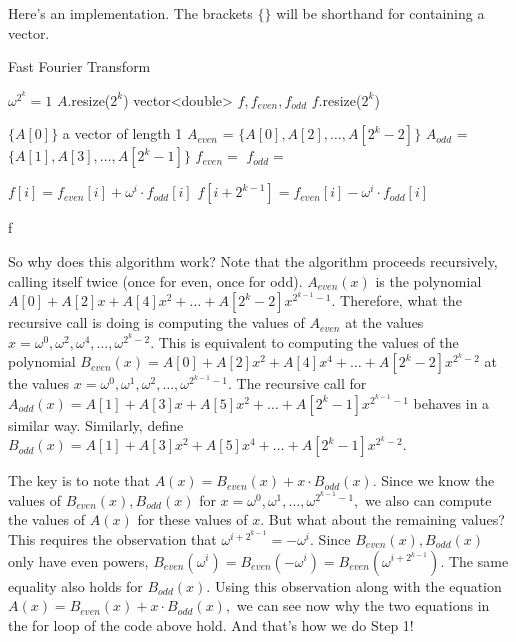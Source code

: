 Here's an implementation. The brackets $\{ \}$ will be shorthand for containing a vector.

\begin{algorithm}[H]
\caption{Fast Fourier Transform}
\begin{algorithmic}
 \Comment $\omega^{2^k} = 1$
	\State $A$.resize($2^k$)
	\State vector<double> $f, f_{even}, f_{odd}$
	\State $f$.resize($2^k$)
	
		\State \Return $ \{A[0] \}$ \Comment a vector of length 1
    \EndIf
    \State $A_{even}$ = $ \{A[0], A[2], \dots, A[2^k-2] \}$
    \State $A_{odd}$ = $ \{A[1], A[3], \dots, A[2^k-1] \}$
    \State $f_{even} = $ 
    \State $f_{odd} = $ 
    
    	\State $f[i] = f_{even}[i] + \omega^i \cdot f_{odd}[i]$
	\State $f[i+2^{k-1}] = f_{even}[i] - \omega^i \cdot f_{odd}[i]$

	\EndFor

\Return f

\EndFunction

\end{algorithmic}
\end{algorithm}

So why does this algorithm work? Note that the algorithm proceeds recursively, calling itself twice (once for even, once for odd). $A_{even}(x)$ is the polynomial $A[0] + A[2]x + A[4]x^2 + \dots + A[2^k-2]x^{2^{k-1}-1}.$ Therefore, what the recursive call is doing is computing the values of $A_{even}$ at the values $x = \omega^0, \omega^2, \omega^4, \dots, \omega^{2^k-2}.$ This is equivalent to computing the values of the polynomial $B_{even}(x) = A[0] + A[2]x^2 + A[4]x^4 + \dots + A[2^k-2]x^{2^{k}-2}$ at the values $x = \omega^0, \omega^1, \omega^2, \dots, \omega^{2^{k-1}-1}.$ The recursive call for $A_{odd}(x) = A[1] + A[3]x + A[5]x^2 + \dots + A[2^k-1]x^{2^{k-1}-1}$ behaves in a similar way. Similarly, define $B_{odd}(x) = A[1] + A[3]x^2 + A[5]x^4 + \dots + A[2^k-1]x^{2^{k}-2}.$

The key is to note that $A(x) = B_{even}(x) + x \cdot B_{odd}(x).$ Since we know the values of $B_{even}(x), B_{odd}(x)$ for $x = \omega^0, \omega^1, \dots, \omega^{2^{k-1}-1},$ we also can compute the values of $A(x)$ for these values of $x$. But what about the remaining values? This requires the observation that $\omega^{i + 2^{k-1}} = -\omega^i.$ Since $B_{even}(x), B_{odd}(x)$ only have even powers, $B_{even}(\omega^i) = B_{even}(-\omega^i) = B_{even}(\omega^{i + 2^{k-1}}).$ The same equality also holds for $B_{odd}(x).$ Using this observation along with the equation $A(x) = B_{even}(x) + x \cdot B_{odd}(x),$ we can see now why the two equations in the for loop of the code above hold. And that's how we do Step 1!

